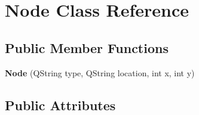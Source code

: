 \hypertarget{class_node}{\section{Node Class Reference}
\label{class_node}
}
\subsection*{Public Member Functions}
\begin{DoxyCompactItemize}
\item 
\hypertarget{class_node_a9187fcac7fd3d010e5a4e66d2ab09ca1}{{\bfseries Node} (Q\-String type, Q\-String location, int x, int y)}\label{class_node_a9187fcac7fd3d010e5a4e66d2ab09ca1}

\end{DoxyCompactItemize}
\subsection*{Public Attributes}
